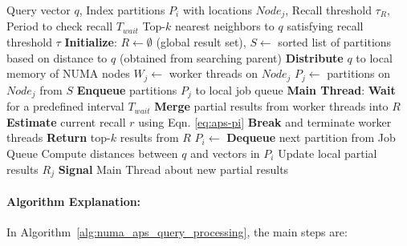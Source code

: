 \begin{algorithm}[h]
\small
\caption{NUMA-Aware Query Processing with Adaptive Partition Selection}
\label{alg:numa_aps_query_processing}
\begin{algorithmic}[1]
\Require Query vector $q$, Index partitions ${P_i}$ with locations ${Node_j}$, Recall threshold $\tau_R$, Period to check recall $T_{wait}$
\Ensure Top-$k$ nearest neighbors to $q$ satisfying recall threshold $\tau$
\State \textbf{Initialize}: $R \leftarrow \emptyset$ (global result set), $S \leftarrow$ sorted list of partitions based on distance to $q$ (obtained from searching parent)
\State \textbf{Distribute} $q$ to local memory of NUMA nodes
\State $W_j \leftarrow$ worker threads on $Node_j$
\State $P_j \leftarrow$ partitions on $Node_j$ from $S$
\State \textbf{Enqueue} partitions $P_j$ to local job queue
\EndFor
{}
\State \textbf{Main Thread}:
\State \textbf{Wait} for a predefined interval $T_{wait}$
\State \textbf{Merge} partial results from worker threads into $R$
\State \textbf{Estimate} current recall $r$ using Eqn. \ref{eq:aps-pi}
\State \textbf{Break} and terminate worker threads
\EndIf
\EndWhile
\State \textbf{Return} top-$k$ results from $R$
\State $P_i \leftarrow$ \textbf{Dequeue} next partition from Job Queue
\State Compute distances between $q$ and vectors in $P_i$
\State Update local partial results $R_j$
\State \textbf{Signal} Main Thread about new partial results
\EndWhile
\EndFunction
\end{algorithmic}
\end{algorithm}

\paragraph{Algorithm Explanation:} In Algorithm~\ref{alg:numa_aps_query_processing}, the main steps are:

